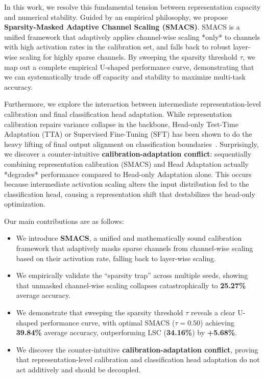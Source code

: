 \documentclass{article}
\theoremstyle{plain}
\theoremstyle{definition}
\theoremstyle{remark}
\begin{document}
In this work, we resolve this fundamental tension between representation capacity and numerical stability. Guided by an empirical philosophy, we propose \textbf{Sparsity-Masked Adaptive Channel Scaling (SMACS)}. SMACS is a unified framework that adaptively applies channel-wise scaling *only* to channels with high activation rates in the calibration set, and falls back to robust layer-wise scaling for highly sparse channels. By sweeping the sparsity threshold $\tau$, we map out a complete empirical U-shaped performance curve, demonstrating that we can systematically trade off capacity and stability to maximize multi-task accuracy.

Furthermore, we explore the interaction between intermediate representation-level calibration and final classification head adaptation. While representation calibration repairs variance collapse in the backbone, Head-only Test-Time Adaptation (TTA) or Supervised Fine-Tuning (SFT) has been shown to do the heavy lifting of final output alignment on classification boundaries~\cite{submission10}. Surprisingly, we discover a counter-intuitive \textbf{calibration-adaptation conflict}: sequentially combining representation calibration (SMACS) and Head Adaptation actually *degrades* performance compared to Head-only Adaptation alone. This occurs because intermediate activation scaling alters the input distribution fed to the classification head, causing a representation shift that destabilizes the head-only optimization.

Our main contributions are as follows:
\begin{itemize}
    \item We introduce \textbf{SMACS}, a unified and mathematically sound calibration framework that adaptively masks sparse channels from channel-wise scaling based on their activation rate, falling back to layer-wise scaling.
    \item We empirically validate the ``sparsity trap'' across multiple seeds, showing that unmasked channel-wise scaling collapses catastrophically to \textbf{25.27\%} average accuracy.
    \item We demonstrate that sweeping the sparsity threshold $\tau$ reveals a clear U-shaped performance curve, with optimal SMACS ($\tau=0.50$) achieving \textbf{39.84\%} average accuracy, outperforming LSC (\textbf{34.16\%}) by \textbf{+5.68\%}.
    \item We discover the counter-intuitive \textbf{calibration-adaptation conflict}, proving that representation-level calibration and classification head adaptation do not act additively and should be decoupled.
\end{itemize}
\end{document}
